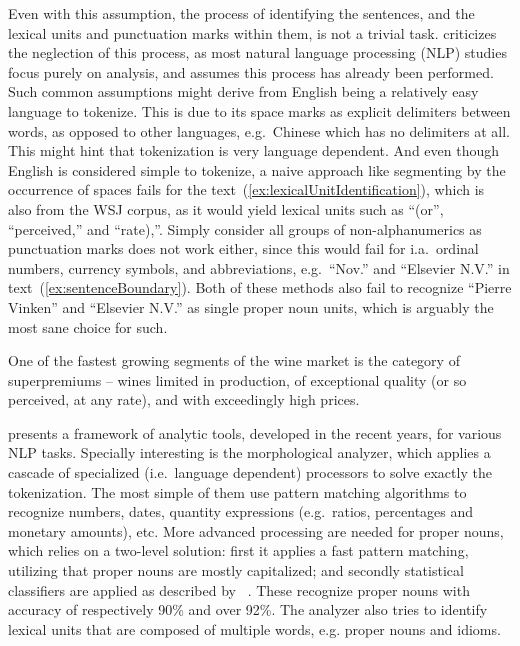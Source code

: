 Even with this assumption, the process of identifying the sentences, and the lexical units and punctuation marks within them, is not a trivial task. \citeauthor{tokenization} criticizes the neglection of this process, as most natural language processing (NLP) studies focus purely on analysis, and assumes this process has already been performed. Such common assumptions might derive from English being a relatively easy language to tokenize. This is due to its space marks as explicit delimiters between words, as opposed to other languages, e.g.\ Chinese which has no delimiters at all. This might hint that tokenization is very language dependent. And even though English is considered simple to tokenize, a naive approach like segmenting by the occurrence of spaces fails for the text~(\ref{ex:lexicalUnitIdentification}), which is also from the WSJ corpus, as it would yield lexical units such as ``(or'', ``perceived,'' and ``rate),''. Simply consider all groups of non-alphanumerics as punctuation marks does not work either, since this would fail for i.a.\ ordinal numbers, currency symbols, and abbreviations, e.g.\ ``Nov.'' and ``Elsevier N.V.'' in text~(\ref{ex:sentenceBoundary}). Both of these methods also fail to recognize ``Pierre Vinken'' and ``Elsevier N.V.'' as single proper noun units, which is arguably the most sane choice for such. 

\begin{numquote1}
One of the fastest growing segments of the wine market is the category of superpremiums -- wines limited in production, of exceptional quality (or so perceived, at any rate), and with exceedingly high prices.
  \label{ex:lexicalUnitIdentification}
\end{numquote1}

\citeauthor{freeLing}  presents a framework of analytic tools, developed in the recent years, for various NLP tasks. Specially interesting is the morphological analyzer, which applies a cascade of specialized (i.e.\ language dependent) processors to solve exactly the tokenization. The most simple of them use pattern matching algorithms to recognize numbers, dates, quantity expressions (e.g.\ ratios, percentages and monetary amounts), etc. More advanced processing are needed for proper nouns, which relies on a two-level solution: first it applies a fast pattern matching, utilizing that proper nouns are mostly capitalized; and secondly statistical classifiers are applied as described by \citeauthor{adaBoost}~. These recognize proper nouns with accuracy of respectively 90\% and over 92\%. The analyzer also tries to identify lexical units that are composed of multiple words, e.g. proper nouns and idioms.

